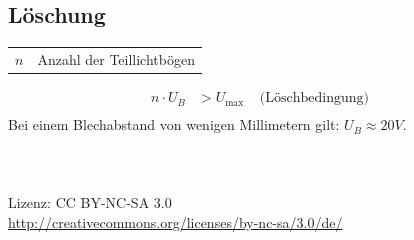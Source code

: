 \documentclass[a4paper,twocolumn,10pt]{article}
\begin{document}
\subsection{Löschung}
\begin{tabular}{ll}
$n$ & Anzahl der Teillichtbögen
\end{tabular}
\begin{equation*}
\begin{split}
n\cdot U_B&>U_{\text{max}}\;\;\;\;\text{(Löschbedingung)}\\
\end{split}
\end{equation*}
Bei einem Blechabstand von wenigen Millimetern gilt: $U_B\approx 20V$.
\\\\\\\\
Lizenz: CC BY-NC-SA 3.0\\
\url{http://creativecommons.org/licenses/by-nc-sa/3.0/de/}
\end{document}
